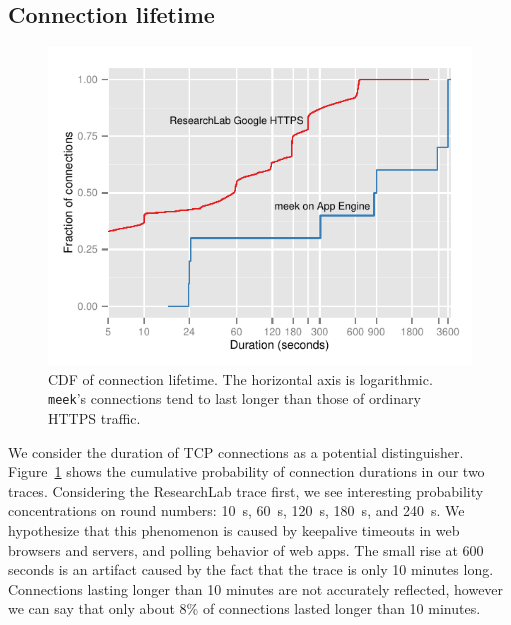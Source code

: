 \documentclass[conference]{IEEEtran}
\newcommand{\meek}{\texttt{meek}\xspace}
\newcommand{\lbl}{ResearchLab\xspace}
\begin{document}
\subsection{Connection lifetime}

\begin{figure}
\centering
\includegraphics[width=\linewidth]{flowduration}
\caption{
CDF of connection lifetime.
The horizontal axis is logarithmic.
\meek's connections tend to last longer than those of ordinary HTTPS traffic.
}
\label{fig:duration}
\end{figure}


We consider the duration of TCP connections as a potential distinguisher.
Figure~\ref{fig:duration} shows the cumulative probability
of connection durations in our two traces.
Considering the \lbl trace first,
we see interesting probability concentrations on
round numbers: 10~s, 60~s, 120~s, 180~s, and 240~s.
We hypothesize that this phenomenon is caused by
keepalive timeouts in web browsers and servers,
and polling behavior of web apps.
The small rise at 600 seconds is an artifact caused
by the fact that the trace is only 10 minutes long.
Connections lasting longer than 10 minutes are not accurately reflected,
however we can say that only about 8\% of connections lasted longer than 10 minutes.
\end{document}
